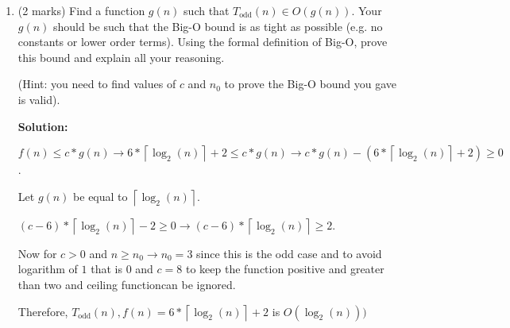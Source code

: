 \documentclass[a4,13pt]{extarticle}
\newenvironment{Solution}{\color{blue}\textbf{Solution:}}{}
\begin{document}
\begin{enumerate}
\begin{enumerate}
\begin{Solution}
	      	      Assumption: Considering the code is being run on a system with the binary number representation is such that the MSB(most significant bit) is the left most bit. In that case the operation on line 12 is division by 2.
	      	    
	      	    It will take $\left \lceil{\log_2(n)}\right \rceil $ divisions  for $n$ to become equal to zero as $0$'s will be introduced to the binary number from the MSB making LSB's fall off.
	      	    
	      	    The approximate running time, $T_{\text{odd}}(n)$ is $f(n) = \runTime{}$
	      	        
	      	      \end{Solution}
	      	    
	      	      	      	                  
	      	\item (2 marks) Find a function $g(n)$ such that $T_{\text{odd}}(n)\in O(g(n))$. 
	      	      Your $g(n)$ should be such that the Big-O bound is as tight as possible (e.g. no constants or lower order terms). 
	      	      Using the formal definition of Big-O, prove this bound and explain all your reasoning. 
	      	      	      	                  
	      	      (Hint: you need to find values of $c$ and $n_0$ to prove the Big-O bound you gave is valid).
	      	      
	      	       \begin{Solution}
 	      	      \def \runTime {6 * \left \lceil{\log_2(n)}\right \rceil + 2}

	      	       
	      	       $f(n) \le c*g(n) \rightarrow \runTime{} \le c*g(n) \rightarrow c*g(n) - (\runTime{}) \geq 0$.
	      	       
	                Let $g(n)$ be equal to $\left \lceil{\log_2(n)}\right \rceil$. 
	                
	               $ (c - 6) * \left \lceil{\log_2(n)}\right \rceil - 2 \geq 0 \rightarrow (c - 6) * \left \lceil{\log_2(n)}\right \rceil \geq 2$.
	               
	               Now for $c > 0$ and $n \geq n_{\text{0}} \rightarrow n_{\text{0}} = 3$ since this is the odd case and to avoid logarithm of $1$ that is $0$ and $c = 8$ to keep the function positive and greater than two and ceiling functioncan be ignored.
	               
	               Therefore, $T_{\text{odd}}(n), f(n) = \runTime{}$ is $O(\log_2(n)))$
	      	       

\end{Solution}
\end{enumerate}
\end{enumerate}
\end{document}

